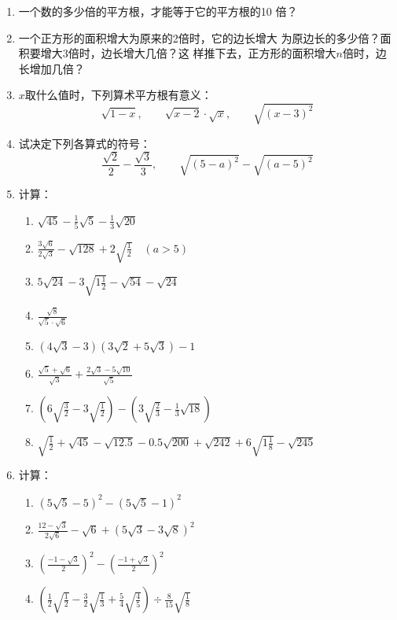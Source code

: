 \begin{enumerate}
\item 一个数的多少倍的平方根，才能等于它的平方根的10
倍？
\item 一个正方形的面积增大为原来的2倍时，它的边长增大
为原边长的多少倍？面积要增大3倍时，边长增大几倍？这
样推下去，正方形的面积增大$n$倍时，边长增加几倍？
\item $x$取什么值时，下列算术平方根有意义：
\[\sqrt{1-x},\qquad \sqrt{x-2}\cdot \sqrt{x},\qquad \sqrt{(x-3)^2}  \]

\item 试决定下列各算式的符号：
\[\frac{\sqrt{2}}{2}-\frac{\sqrt{3}}{3},\qquad \sqrt{(5-a)^2}-\sqrt{(a-5)^2} \]

\item 计算：
\begin{enumerate}
    \item $\sqrt{45}-\frac{1}{5}\sqrt{5}-\frac{1}{3}\sqrt{20}$
    \item $\frac{3\sqrt{6}}{2\sqrt{3}}-\sqrt{128}+2\sqrt{\frac{1}{2}}\quad (a>5)$
    \item $5\sqrt{24}-3\sqrt{1\frac{1}{2}}-\sqrt{54}-\sqrt{24}$
    \item $\frac{\sqrt{8}}{\sqrt{5}\cdot \sqrt{6}}$
    \item $\left(4\sqrt{3}-3\right)\left(3\sqrt{2}+5\sqrt{3}\right)-1$
    \item $\frac{\sqrt{5}+\sqrt{6}}{\sqrt{3}}+\frac{2\sqrt{3}-5\sqrt{10}}{\sqrt{5}}$
    \item $\left(6\sqrt{\frac{3}{2}}-3\sqrt{\frac{1}{2}}\right)-\left(3\sqrt{\frac{2}{3}}-\frac{1}{3}\sqrt{18}\right)$
    \item $\sqrt{\frac{1}{2}}+\sqrt{45}-\sqrt{12.5}-0.5\sqrt{200}+\sqrt{242}+6\sqrt{1\frac{1}{8}}-\sqrt{245}$
\end{enumerate}

\item 计算：
\begin{enumerate}
    \item $\left(5\sqrt{5}-5\right)^2-\left(5\sqrt{5}-1\right)^2$
    \item $\frac{12-\sqrt{3}}{2\sqrt{6}}-\sqrt{6}+\left(5\sqrt{3}-3\sqrt{8}\right)^2$
    \item $\left(\frac{-1-\sqrt{3}}{2}\right)^2-\left(\frac{-1+\sqrt{3}}{2}\right)^2$
    \item $\left(\frac{1}{2}\sqrt{\frac{1}{2}}-\frac{3}{2}\sqrt{\frac{1}{3}}+\frac{5}{4}\sqrt{\frac{4}{5}}\right)\div \frac{8}{15}\sqrt{\frac{1}{8}}$

\end{enumerate}


\end{enumerate}

